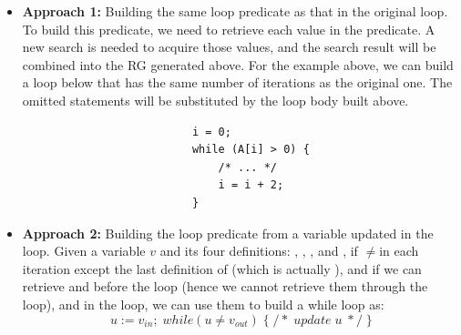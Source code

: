 \documentclass[12pt]{gatech-thesis}
\begin{document}

\begin{itemize}
\setlength{\itemsep}{5pt}%

\item \textbf{Approach 1:} Building the same loop predicate as that in the original loop. 
To build this predicate, we need to retrieve each value in the predicate.
A new search is needed to acquire those values, and the search result will be combined into the RG generated above.
For the example above, we can build a loop below that has the same number of iterations as the original one. The omitted statements will be substituted by the loop body built above.



\small
\begin{verbatim}
                          i = 0;
                          while (A[i] > 0) {
                              /* ... */
                              i = i + 2;
                          }
\end{verbatim}
\normalsize




\item \textbf{Approach 2:} Building the loop predicate from a variable updated in the loop. Given a variable $v$ and its four definitions: \vinit, \vmu, \viter, and \vfinal, if \vmu$\ne$\vfinal in each iteration except the last definition of \vmu (which is actually \vfinal), and if we can retrieve \vinit and \vfinal before the loop (hence we cannot retrieve them through the loop), and \viter in the loop, we can use them to build a while loop as:
$$
u := v_{in}; \; while (u \ne v_{out}) \;  \{\; /* \; update \; u \; */ \; \}
$$


\end{itemize}
\end{document}
